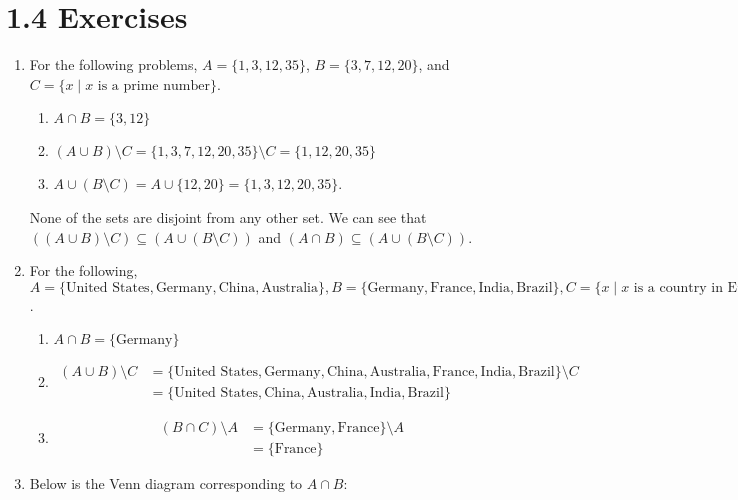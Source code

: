 \documentclass{article}
\begin{document}
\section*{1.4 Exercises}
\begin{enumerate}
\item
  For the following problems, $A = \{1,3,12,35\}$, $B = \{3,7,12,20\}$, and $C = \{x \mid x \text{ is a prime number}\}$.
  \begin{enumerate}
  \item
    $A \cap B = \{3,12\}$
  \item
    $(A \cup B) \setminus C = \{1,3,7,12,20,35\} \setminus C = \{1,12,20,35\}$
  \item
    $A \cup (B \setminus C) = A \cup \{12, 20\} = \{1,3,12,20,35\}$.
  \end{enumerate}
  None of the sets are disjoint from any other set.  We can see that $((A \cup B) \setminus C) \subseteq (A \cup (B \setminus C))$ and $(A \cap B) \subseteq (A \cup (B \setminus C))$.
\item
  For the following, $A = \{\text{United States}, \text{Germany}, \text{China}, \text{Australia}\}, B = \{\text{Germany}, \text{France}, \text{India}, \text{Brazil}\}, C = \{x \mid x \text{ is a country in Europe}\}$.
  \begin{enumerate}
  \item
    $A \cap B = \{\text{Germany}\}$
  \item
    \begin{equation*}
      \begin{aligned}
	(A \cup B) \setminus C &= \{\text{United States}, \text{Germany}, \text{China}, \text{Australia}, \text{France}, \text{India}, \text{Brazil}\} \setminus C \\
	&= \{\text{United States}, \text{China}, \text{Australia}, \text{India}, \text{Brazil}\}
       \end{aligned}
    \end{equation*}
  \item
    \begin{equation*}
      \begin{aligned}
	(B \cap C) \setminus A &= \{\text{Germany}, \text{France}\} \setminus A \\
	&= \{\text{France}\}
      \end{aligned}
      \end{equation*}
  \end{enumerate}
\item Below is the Venn diagram corresponding to $A \cap B$:


\end{enumerate}
\end{document}
